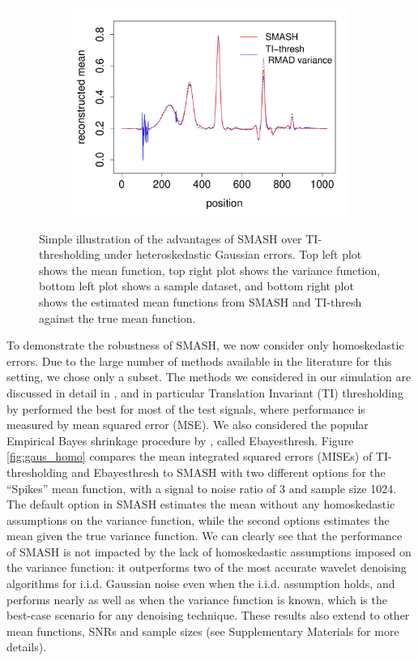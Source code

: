 \documentclass[12pt]{article}
\begin{document}
\begin{figure}
\begin{subfigure}[b]{0.48\textwidth}
        \includegraphics[width=\textwidth]{simple_eg_5.pdf}
        \caption{}
        \label{fig:simple_eg_5}
    \end{subfigure}
    \caption{Simple illustration of the advantages of SMASH over TI-thresholding under heteroskedastic Gaussian errors. Top left plot shows the mean function, top right plot shows the variance function, bottom left plot shows a sample dataset, and bottom right plot shows the estimated mean functions from SMASH and TI-thresh against the true mean function.}
    \label{fig:simple_eg}
\end{figure}


To demonstrate the robustness of SMASH, we now consider only homoskedastic errors. Due to the large number of methods available in the literature for this setting, we chose only a subset. The methods we considered in our simulation are discussed in detail in \cite{Antoniadis2001Wavelet}, and in particular Translation Invariant (TI) thresholding by \cite{Coifman1995Translationinvariant} performed the best for most of the test signals, where performance is measured by mean squared error (MSE). We also considered the popular Empirical Bayes shrinkage procedure by \cite{Johnstone2005Empirical}, called Ebayesthresh. Figure \ref{fig:gaus_homo} compares the mean integrated squared errors (MISEs) of TI-thresholding and Ebayesthresh to SMASH with two different options for the ``Spikes'' mean function, with a signal to noise ratio of 3 and sample size 1024. The default option in SMASH estimates the mean without any homoskedastic assumptions on the variance function, while the second options estimates the mean given the true variance function. We can clearly see that the performance of SMASH is not impacted by the lack of homoskedastic assumptions imposed on the variance function: it outperforms two of the most accurate wavelet denoising algorithms for i.i.d. Gaussian noise even when the i.i.d. assumption holds, and performs nearly as well as when the variance function is known, which is the best-case scenario for any denoising technique. These results also extend to other mean functions, SNRs and sample sizes (see Supplementary Materials for more details).
\end{document}
